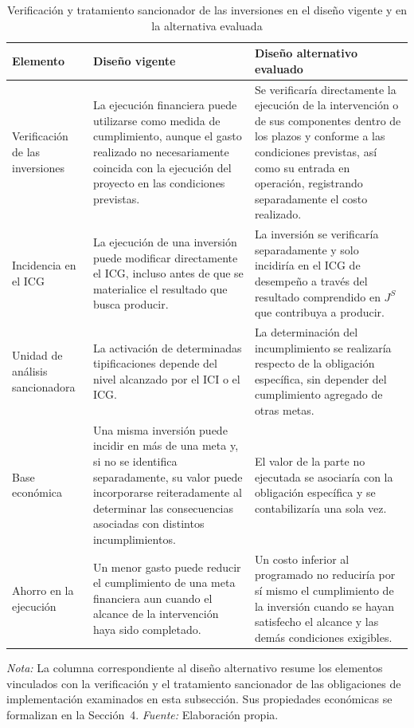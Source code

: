 \begin{table}[t]
\caption{Verificación y tratamiento sancionador de las inversiones en el diseño vigente y en la alternativa evaluada}
\label{tab:comparacion_diseno_separacion}
\centering
\small
\renewcommand{\arraystretch}{1.25}
\setlength{\tabcolsep}{5pt}
\begin{tabularx}{\textwidth}{
@{}
>{\raggedright\arraybackslash}p{}
>{\raggedright\arraybackslash}X
>{\raggedright\arraybackslash}X
@{}
}
\hline
\textbf{Elemento} &
\textbf{Diseño vigente} &
\textbf{Diseño alternativo evaluado} \\
\hline
Verificación de las inversiones &
La ejecución financiera puede utilizarse como medida de cumplimiento, aunque el gasto realizado no necesariamente coincida con la ejecución del proyecto en las condiciones previstas. &
Se verificaría directamente la ejecución de la intervención o de sus componentes dentro de los plazos y conforme a las condiciones previstas, así como su entrada en operación, registrando separadamente el costo realizado. \\
Incidencia en el ICG &
La ejecución de una inversión puede modificar directamente el ICG, incluso antes de que se materialice el resultado que busca producir. &
La inversión se verificaría separadamente y solo incidiría en el ICG de desempeño a través del resultado comprendido en \(J^{S}\) que contribuya a producir. \\
Unidad de análisis sancionadora &
La activación de determinadas tipificaciones depende del nivel alcanzado por el ICI o el ICG. &
La determinación del incumplimiento se realizaría respecto de la obligación específica, sin depender del cumplimiento agregado de otras metas. \\
Base económica &
Una misma inversión puede incidir en más de una meta y, si no se identifica separadamente, su valor puede incorporarse reiteradamente al determinar las consecuencias asociadas con distintos incumplimientos. &
El valor de la parte no ejecutada se asociaría con la obligación específica y se contabilizaría una sola vez. \\
Ahorro en la ejecución &
Un menor gasto puede reducir el cumplimiento de una meta financiera aun cuando el alcance de la intervención haya sido completado. &
Un costo inferior al programado no reduciría por sí mismo el cumplimiento de la inversión cuando se hayan satisfecho el alcance y las demás condiciones exigibles. \\
\hline
\end{tabularx}
\begin{flushleft}
\footnotesize
\textit{Nota:} La columna correspondiente al diseño alternativo resume los elementos vinculados con la verificación y el tratamiento sancionador de las obligaciones de implementación examinados en esta subsección. Sus propiedades económicas se formalizan en la Sección~4. \textit{Fuente:} Elaboración propia.
\end{flushleft}
\end{table}

